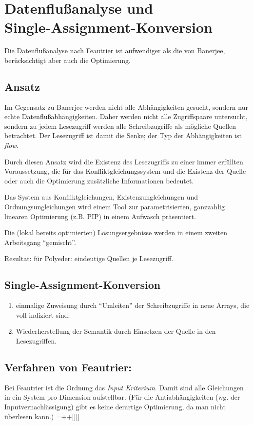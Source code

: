 \section{Datenflußanalyse und \\Single-Assignment-Konversion}
Die Datenflußanalyse nach Feautrier \cite{Fea91} ist aufwendiger als die von
Banerjee, berücksichtigt aber auch die Optimierung.

\subsection{Ansatz}
Im Gegensatz zu Banerjee werden nicht alle Abhängigkeiten gesucht,
sondern nur echte Datenflußabhängigkeiten. Daher werden nicht alle
Zugriffspaare untersucht, sondern zu jedem Lesezugriff werden alle
Schreibzugriffe als mögliche Quellen betrachtet. Der Lesezugriff ist
damit die Senke; der Typ der Abhängigkeiten ist \emph{flow}.

Durch diesen Ansatz wird die Existenz des Lesezugriffs zu einer immer
erfüllten Voraussetzung, die für das Konfliktgleichungssystem und die
Existenz der Quelle oder auch die Optimierung zusätzliche Informationen
bedeutet.

Das System aus Konfliktgleichungen, Existenzungleichungen und
Ordnungsungleichungen wird einem Tool zur parametrisierten, ganzzahlig
linearen Optimierung (z.B. PIP) in einem Aufwasch präsentiert.

Die (lokal bereits optimierten) Lösungsergebnisse werden in einem
zweiten Arbeitsgang ``gemischt''.

Resultat: für Polyeder: eindeutige Quellen je Lesezugriff.

\subsection{Single-Assignment-Konversion}
\begin{enumerate}
\item einmalige Zuweisung durch ``Umleiten'' der Schreibzugriffe in
  neue Arrays, die voll indiziert sind.
\item Wiederherstellung der Semantik durch Einsetzen der Quelle in den
  Lesezugriffen.
\end{enumerate}

\subsection{Verfahren von Feautrier:}
Bei Feautrier ist die Ordnung das \emph{Input Kriterium}. Damit sind alle Gleichungen in ein System pro Dimension aufstellbar. (Für die Antiabhängigkeiten (wg. der Inputvernachlässigung) gibt es keine derartige Optimierung, da man nicht überlesen kann.)
\entrymodifiers={++[][]}

